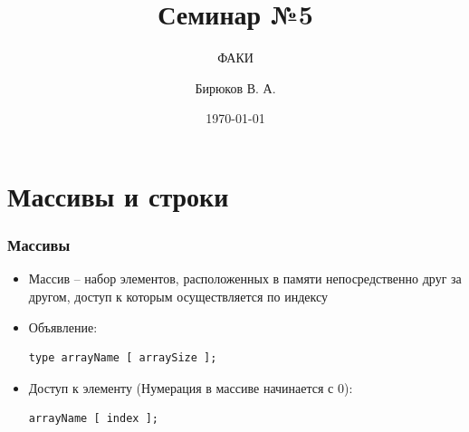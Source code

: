 \documentclass[12pt,pdf,hyperref={unicode}]{beamer}
\title{Семинар №5}
\subtitle{ФАКИ \the\year}
\author{Бирюков В. А.}
\date{\today}
\begin{document}
\lstset{language=C}

\begin{frame}
\titlepage
\end{frame} 



\section{Массивы и строки}

\begin{frame}[fragile]
\frametitle{Массивы} 
\begin{itemize}
\item Массив -- набор элементов, расположенных в памяти непосредственно друг за другом, доступ к которым осуществляется по индексу
\item Объявление:
\begin{lstlisting}
type arrayName [ arraySize ];
\end{lstlisting}
\item Доступ к элементу
(Нумерация в массиве начинается с 0):\\
\begin{lstlisting}
arrayName [ index ];
\end{lstlisting}
\end{itemize}
\end{frame}
\end{document}
